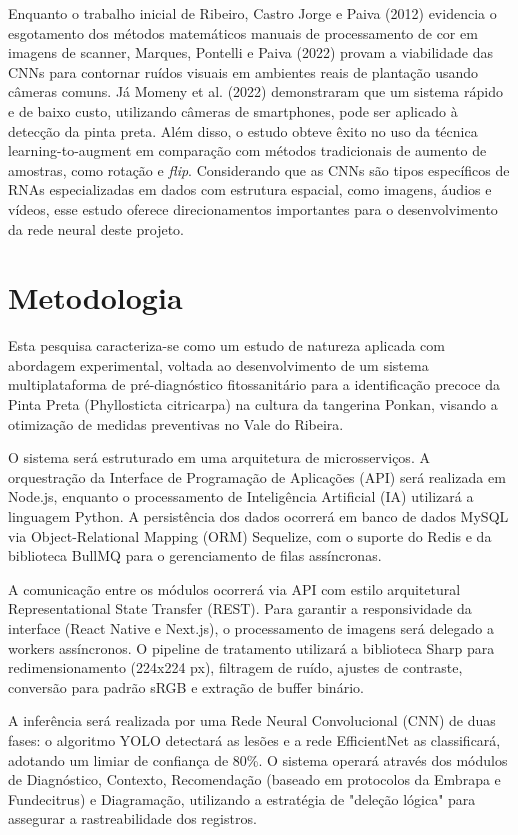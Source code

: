 \documentclass[11pt,a4paper]{article}
\begin{document}
Enquanto o trabalho inicial de Ribeiro, Castro Jorge e Paiva (2012) \cite{Ribeiro2012} evidencia o esgotamento dos métodos matemáticos manuais de processamento de cor em imagens de scanner, Marques, Pontelli e Paiva (2022) \cite{Marques2022} provam a viabilidade das CNNs para contornar ruídos visuais em ambientes reais de plantação usando câmeras comuns. Já Momeny et al. (2022) \cite{Momeny2022} demonstraram que um sistema rápido e de baixo custo, utilizando câmeras de smartphones, pode ser aplicado à detecção da pinta preta. Além disso, o estudo obteve êxito no uso da técnica learning-to-augment em comparação com métodos tradicionais de aumento de amostras, como rotação e \emph{flip}. Considerando que as CNNs são tipos específicos de RNAs especializadas em dados com estrutura espacial, como imagens, áudios e vídeos, esse estudo oferece direcionamentos importantes para o desenvolvimento da rede neural deste projeto.


\section{Metodologia}

Esta pesquisa caracteriza-se como um estudo de natureza aplicada com abordagem experimental, voltada ao desenvolvimento de um sistema multiplataforma de pré-diagnóstico fitossanitário para a identificação precoce da Pinta Preta (Phyllosticta citricarpa) na cultura da tangerina Ponkan, visando a otimização de medidas preventivas no Vale do Ribeira.

O sistema será estruturado em uma arquitetura de microsserviços. A orquestração da Interface de Programação de Aplicações (API) será realizada em Node.js, enquanto o processamento de Inteligência Artificial (IA) utilizará a linguagem Python. A persistência dos dados ocorrerá em banco de dados MySQL via Object-Relational Mapping (ORM) Sequelize, com o suporte do Redis e da biblioteca BullMQ para o gerenciamento de filas assíncronas.

A comunicação entre os módulos ocorrerá via API com estilo arquitetural Representational State Transfer (REST). Para garantir a responsividade da interface (React Native e Next.js), o processamento de imagens será delegado a workers assíncronos. O pipeline de tratamento utilizará a biblioteca Sharp para redimensionamento (224x224 px), filtragem de ruído, ajustes de contraste, conversão para padrão sRGB e extração de buffer binário.

A inferência será realizada por uma Rede Neural Convolucional (CNN) de duas fases: o algoritmo YOLO detectará as lesões e a rede EfficientNet as classificará, adotando um limiar de confiança de 80\%. O sistema operará através dos módulos de Diagnóstico, Contexto, Recomendação (baseado em protocolos da Embrapa e Fundecitrus) e Diagramação, utilizando a estratégia de "deleção lógica" para assegurar a rastreabilidade dos registros.
\end{document}
